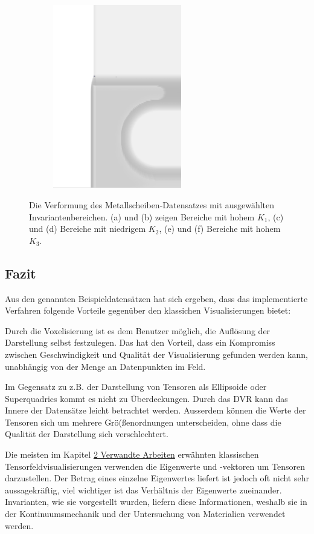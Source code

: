 \documentclass[a4paper,fontsize=12pt,toc=bib,halfparskip,ngerman]{scrartcl}
\begin{document}
\begin{figure}
\begin{subfigure}{0.49\textwidth}
		\subcaption{}
		\label{}
	\end{subfigure}
	\hspace*{\fill}
	\begin{subfigure}{0.49\textwidth}
		\centering
		\includegraphics[height=8cm]{pictures/results/Nodel/Nodel_Object2.png}
		\subcaption{}
		\label{}
	\end{subfigure}
	\caption{Die Verformung des Metallscheiben-Datensatzes mit ausgew\"ahlten Invariantenbereichen. (a) und (b) zeigen Bereiche mit hohem $K_1$, (c) und (d) Bereiche mit niedrigem $K_2$, (e) und (f) Bereiche mit hohem $K_3$.}
	\label{}
\end{figure}

\subsection{Fazit}
Aus den genannten Beispieldatens\"atzen hat sich ergeben, dass das implementierte Verfahren folgende Vorteile gegen\"uber den klassichen Visualisierungen bietet:

Durch die Voxelisierung ist es dem Benutzer m\"oglich, die Aufl\"osung der Darstellung selbst festzulegen. Das hat den Vorteil, dass ein Kompromiss zwischen Geschwindigkeit und Qualit\"at der Visualisierung gefunden werden kann, unabh\"angig von der Menge an Datenpunkten im Feld. 

Im Gegensatz zu z.B. der Darstellung von Tensoren als Ellipsoide oder Superquadrics kommt es nicht zu \"Uberdeckungen. Durch das DVR kann das Innere der Datens\"atze leicht betrachtet werden. Ausserdem k\"onnen die Werte der Tensoren sich um mehrere Gr\"o{(\ss}enordnungen unterscheiden, ohne dass die Qualit\"at der Darstellung sich verschlechtert.

Die meisten im Kapitel \hyperref[sec:Verwandte]{2 Verwandte Arbeiten} erw\"ahnten klassischen Tensorfeldvisualisierungen verwenden die Eigenwerte und -vektoren um Tensoren darzustellen. Der Betrag eines einzelne Eigenwertes liefert ist jedoch oft nicht sehr aussagekr\"aftig, viel wichtiger ist das Verh\"altnis der Eigenwerte zueinander. Invarianten, wie sie vorgestellt wurden, liefern diese Informationen, weshalb sie in der Kontinuumsmechanik und der Untersuchung von Materialien verwendet werden.
\end{document}
